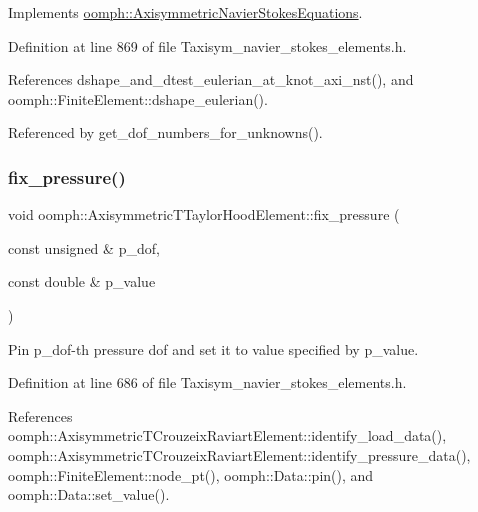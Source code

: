 Implements \hyperlink{classoomph_1_1AxisymmetricNavierStokesEquations_a8d958da8ef73dcf5c68360edc9d9f565}{oomph\+::\+Axisymmetric\+Navier\+Stokes\+Equations}.



Definition at line 869 of file Taxisym\+\_\+navier\+\_\+stokes\+\_\+elements.\+h.



References dshape\+\_\+and\+\_\+dtest\+\_\+eulerian\+\_\+at\+\_\+knot\+\_\+axi\+\_\+nst(), and oomph\+::\+Finite\+Element\+::dshape\+\_\+eulerian().



Referenced by get\+\_\+dof\+\_\+numbers\+\_\+for\+\_\+unknowns().

\mbox{\label{classoomph_1_1AxisymmetricTTaylorHoodElement_a8ae1c5e864429c8c08e7776a5851d042}} 
\subsubsection{\texorpdfstring{fix\+\_\+pressure()}{fix\_pressure()}}
{\footnotesize\ttfamily void oomph\+::\+Axisymmetric\+T\+Taylor\+Hood\+Element\+::fix\+\_\+pressure (\begin{DoxyParamCaption}\item[{const unsigned \&}]{p\+\_\+dof,  }\item[{const double \&}]{p\+\_\+value }\end{DoxyParamCaption})\hspace{0.3cm}{\ttfamily [inline]}}



Pin p\+\_\+dof-\/th pressure dof and set it to value specified by p\+\_\+value. 



Definition at line 686 of file Taxisym\+\_\+navier\+\_\+stokes\+\_\+elements.\+h.



References oomph\+::\+Axisymmetric\+T\+Crouzeix\+Raviart\+Element\+::identify\+\_\+load\+\_\+data(), oomph\+::\+Axisymmetric\+T\+Crouzeix\+Raviart\+Element\+::identify\+\_\+pressure\+\_\+data(), oomph\+::\+Finite\+Element\+::node\+\_\+pt(), oomph\+::\+Data\+::pin(), and oomph\+::\+Data\+::set\+\_\+value().

